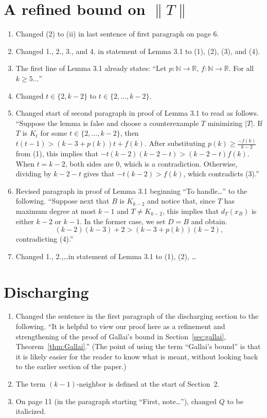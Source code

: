 \documentclass{article}
\newcommand{\IN}{\mathbb{N}}
\newcommand{\IR}{\mathbb{R}}
\begin{document}
\section{A refined bound on $\|T\|$}
\begin{enumerate}
\item Changed (2) to (ii) in last sentence of first paragraph on page 6.
\item Changed 1., 2., 3., and 4. in statement of Lemma 3.1 to (1), (2), (3), and
(4).
\item The first line of Lemma 3.1 already states: ``Let $p:\IN\to\IR$,
$f:\IN\to\IR$.  For all $k\ge 5\ldots$''
\item Changed $t\in\{2,k-2\}$ to $t\in\{2,\ldots,k-2\}$.
\item Changed start of second paragraph in proof of Lemma 3.1 to read as
follows.  ``Suppose the lemma is false and choose a counterexample $T$ minimizing $|T|$. 
If $T$ is $K_t$ for some $t \in \{2,\ldots,k-2\}$, then $t(t-1) > (k-3 + p(k))t +
f(k)$.  After substituting $p(k)\ge \frac{-f(k)}{k-2}$ from (1), this
implies that $-t(k-2)(k-2-t)>(k-2-t)f(k)$.  When $t=k-2$, both sides are 0,
which is a contradiction.  Otherwise, dividing by $k-2-t$ gives that
$-t(k-2)>f(k)$, which contradicts (3).''
	
\item Revised paragraph in proof of Lemma 3.1 beginning ``To handle\ldots'' to
the following.
``Suppose next that $B$ is $K_{k-2}$ and notice that, since $T$ has maximum degree
at most $k-1$ and $T\ne K_{k-2}$, this implies that $d_T(x_B)$ is either $k-2$
or $k-1$.  In the former case, we set $D=B$ and obtain.
	\[(k-2)(k-3) +2 > (k-3 + p(k))(k-2),\]
	contradicting (4).''

\item Changed 1., 2.,\ldots in statement of Lemma 3.1 to (1), (2), \ldots
\end{enumerate}
\section{Discharging}
\begin{enumerate}
\item Changed the sentence in the first paragraph of the discharging section to
the following.  ``It is helpful to view our proof here as a refinement and
strengthening of the proof of Gallai's bound in Section~\ref{sec:gallai},
Theorem~\ref{thm:Gallai}.''  (The point of using the term ``Gallai's bound'' is
that it is likely easier for the reader to know what is meant, without looking
back to the earlier section of the paper.)
\item The term $(k-1)$-neighbor is defined at the start of Section~2.
\item On page 11 (in the paragraph starting ``First, note\ldots''), changed $Q$
to be italicized.
\end{enumerate}
\end{document}
